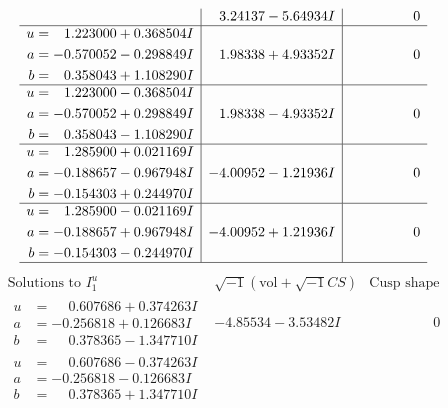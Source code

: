 \documentclass[1p]{elsarticle_modified}
\theoremstyle{definition}
\newcommand{\I}{\sqrt{-1}}
\begin{document}
$$\begin{array}{c|c|c}
 & \phantom{-}3.24137 - 5.64934 I & \phantom{-0.000000 } 0 \\ \hline\begin{aligned}
u &= \phantom{-}1.223000 + 0.368504 I \\
a &= -0.570052 - 0.298849 I \\
b &= \phantom{-}0.358043 + 1.108290 I\end{aligned}
 & \phantom{-}1.98338 + 4.93352 I & \phantom{-0.000000 } 0 \\ \hline\begin{aligned}
u &= \phantom{-}1.223000 - 0.368504 I \\
a &= -0.570052 + 0.298849 I \\
b &= \phantom{-}0.358043 - 1.108290 I\end{aligned}
 & \phantom{-}1.98338 - 4.93352 I & \phantom{-0.000000 } 0 \\ \hline\begin{aligned}
u &= \phantom{-}1.285900 + 0.021169 I \\
a &= -0.188657 - 0.967948 I \\
b &= -0.154303 + 0.244970 I\end{aligned}
 & -4.00952 - 1.21936 I & \phantom{-0.000000 } 0 \\ \hline\begin{aligned}
u &= \phantom{-}1.285900 - 0.021169 I \\
a &= -0.188657 + 0.967948 I \\
b &= -0.154303 - 0.244970 I\end{aligned}
 & -4.00952 + 1.21936 I & \phantom{-0.000000 } 0\\
 \hline 
 \end{array}$$\newpage$$\begin{array}{c|c|c}  
\text{Solutions to }I^u_{1}& \I (\text{vol} + \sqrt{-1}CS) & \text{Cusp shape}\\
 \hline 
\begin{aligned}
u &= \phantom{-}0.607686 + 0.374263 I \\
a &= -0.256818 + 0.126683 I \\
b &= \phantom{-}0.378365 - 1.347710 I\end{aligned}
 & -4.85534 - 3.53482 I & \phantom{-0.000000 } 0 \\ \hline\begin{aligned}
u &= \phantom{-}0.607686 - 0.374263 I \\
a &= -0.256818 - 0.126683 I \\
b &= \phantom{-}0.378365 + 1.347710 I\end{aligned}

\end{array}$$
\end{document}
